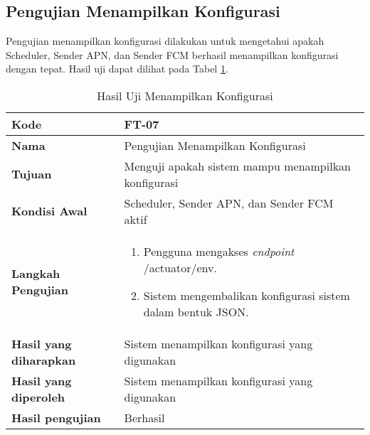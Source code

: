 \subsection{Pengujian Menampilkan Konfigurasi}
\par Pengujian menampilkan konfigurasi dilakukan untuk mengetahui apakah Scheduler, Sender APN, dan Sender FCM berhasil menampilkan konfigurasi dengan tepat. Hasil uji dapat dilihat pada Tabel \ref{t:uji_menampilkan_konfigurasi}.
\begin{longtable}{|p{3cm}|p{6.5cm}|}
	\caption{Hasil Uji Menampilkan Konfigurasi} \label{t:uji_menampilkan_konfigurasi} \\ \hline
	\textbf{Kode} & FT-07 \\ \hline
	\textbf{Nama} & Pengujian Menampilkan Konfigurasi \\ \hline
	\textbf{Tujuan} & Menguji apakah sistem mampu menampilkan konfigurasi \\ \hline
	\textbf{Kondisi Awal} & Scheduler, Sender APN, dan Sender FCM aktif \\ \hline
	\textbf{Langkah Pengujian} &  
	\begin{enumerate}
		\item Pengguna mengakses \textit{endpoint} /actuator/env.
		\item Sistem mengembalikan konfigurasi sistem dalam bentuk JSON.
	\end{enumerate} \\ \hline
	\textbf{Hasil yang diharapkan} & Sistem menampilkan konfigurasi yang digunakan \\ \hline
	\textbf{Hasil yang diperoleh} & Sistem menampilkan konfigurasi yang digunakan \\ \hline
	\textbf{Hasil pengujian} & Berhasil \\ \hline
\end{longtable}

